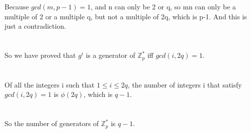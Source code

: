 \documentclass{article}
\begin{document}
\\ \hspace*{\fill} \\
Because $gcd(m, p-1) = 1$, and n can only be 2 or q, so mn can only be a multiple of 2 or a multiple q, but not a multiple of 2q, which is p-1. And this is just a contradiction.\\
\\ \hspace*{\fill} \\
So we have proved that $g^i$ is a generator of $\mathbb{Z}_p^*$ iff $gcd(i, 2q) = 1$.\\
\\ \hspace*{\fill} \\
Of all the integers i such that $1 \leq i \leq 2q$, the number of integers i that satisfy $gcd(i, 2q) = 1$ is $\phi(2q)$, which is $q-1$.\\
\\ \hspace*{\fill} \\
So the number of generators of $\mathbb{Z}_p^*$ is $q-1$.\\
\\ \hspace*{\fill} \\
\newpage
\end{document}
